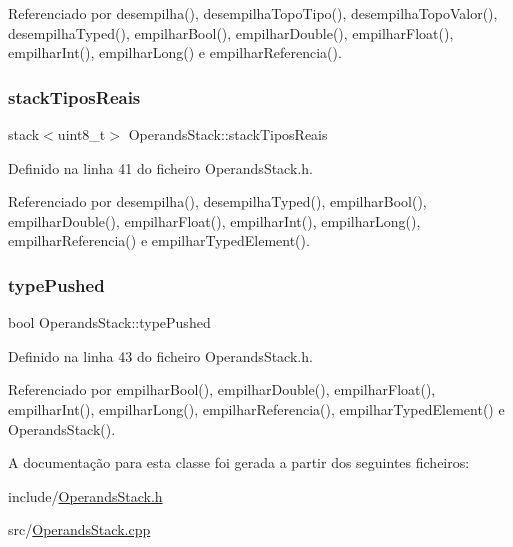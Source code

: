 Referenciado por desempilha(), desempilha\+Topo\+Tipo(), desempilha\+Topo\+Valor(), desempilha\+Typed(), empilhar\+Bool(), empilhar\+Double(), empilhar\+Float(), empilhar\+Int(), empilhar\+Long() e empilhar\+Referencia().

\mbox{\label{classOperandsStack_a14729c0f92cf41d1ec65660a7c82555a}} 
\subsubsection{\texorpdfstring{stack\+Tipos\+Reais}{stackTiposReais}}
{\footnotesize\ttfamily stack$<$uint8\+\_\+t$>$ Operands\+Stack\+::stack\+Tipos\+Reais\hspace{0.3cm}{\ttfamily [private]}}



Definido na linha 41 do ficheiro Operands\+Stack.\+h.



Referenciado por desempilha(), desempilha\+Typed(), empilhar\+Bool(), empilhar\+Double(), empilhar\+Float(), empilhar\+Int(), empilhar\+Long(), empilhar\+Referencia() e empilhar\+Typed\+Element().

\mbox{\label{classOperandsStack_a375521777d4992bc1018eb40da015e70}} 
\subsubsection{\texorpdfstring{type\+Pushed}{typePushed}}
{\footnotesize\ttfamily bool Operands\+Stack\+::type\+Pushed\hspace{0.3cm}{\ttfamily [private]}}



Definido na linha 43 do ficheiro Operands\+Stack.\+h.



Referenciado por empilhar\+Bool(), empilhar\+Double(), empilhar\+Float(), empilhar\+Int(), empilhar\+Long(), empilhar\+Referencia(), empilhar\+Typed\+Element() e Operands\+Stack().



A documentação para esta classe foi gerada a partir dos seguintes ficheiros\+:\begin{DoxyCompactItemize}
\item 
include/\hyperlink{OperandsStack_8h}{Operands\+Stack.\+h}\item 
src/\hyperlink{OperandsStack_8cpp}{Operands\+Stack.\+cpp}\end{DoxyCompactItemize}
